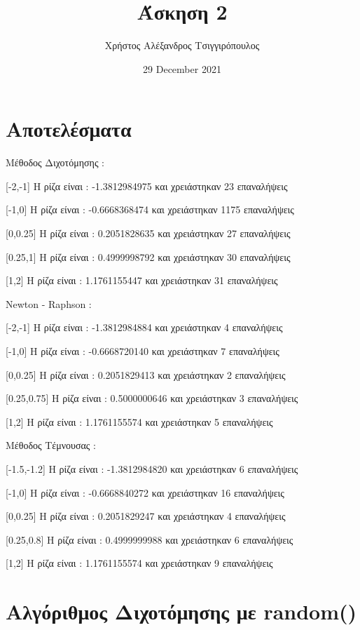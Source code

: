 \documentclass{article}
\title{Άσκηση 2}
\author{Χρήστος Αλέξανδρος Τσιγγιρόπουλος}
\date{29 December 2021}
\begin{document}
    \maketitle
    \section{Αποτελέσματα}
        
    Μέθοδος Διχοτόμησης :
    
    [-2,-1]  Η ρίζα είναι : -1.3812984975  και χρειάστηκαν 23  επαναλήψεις
    
    [-1,0]  Η ρίζα είναι : -0.6668368474  και χρειάστηκαν 1175  επαναλήψεις
    
    [0,0.25]  Η ρίζα είναι : 0.2051828635  και χρειάστηκαν 27  επαναλήψεις
    
    [0.25,1]  Η ρίζα είναι : 0.4999998792  και χρειάστηκαν 30  επαναλήψεις
    
    [1,2]  Η ρίζα είναι : 1.1761155447  και χρειάστηκαν 31  επαναλήψεις
 
    Newton - Raphson    :
    
    [-2,-1]  Η ρίζα είναι : -1.3812984884  και χρειάστηκαν 4  επαναλήψεις
    
    [-1,0]  Η ρίζα είναι : -0.6668720140  και χρειάστηκαν 7  επαναλήψεις
    
    [0,0.25]  Η ρίζα είναι : 0.2051829413  και χρειάστηκαν 2  επαναλήψεις
    
    [0.25,0.75]  Η ρίζα είναι : 0.5000000646  και χρειάστηκαν 3  επαναλήψεις
    
    [1,2]  Η ρίζα είναι : 1.1761155574  και χρειάστηκαν 5  επαναλήψεις
    
    Μέθοδος Τέμνουσας   :
    
    [-1.5,-1.2]  Η ρίζα είναι : -1.3812984820  και χρειάστηκαν 6  επαναλήψεις
    
    [-1,0]  Η ρίζα είναι : -0.6668840272  και χρειάστηκαν 16  επαναλήψεις
    
    [0,0.25]  Η ρίζα είναι : 0.2051829247  και χρειάστηκαν 4  επαναλήψεις
    
    [0.25,0.8]  Η ρίζα είναι : 0.4999999988  και χρειάστηκαν 6  επαναλήψεις
    
    [1,2]  Η ρίζα είναι : 1.1761155574  και χρειάστηκαν 9  επαναλήψεις
    
    
    \section{Αλγόριθμος Διχοτόμησης με random()}
    
\end{document}
